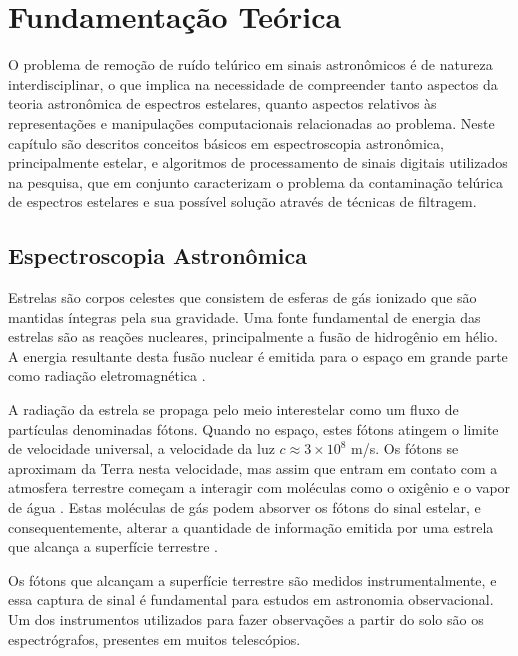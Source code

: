 \chapter{Fundamentação Teórica}
\label{cap:fundamentacao-teorica}

O problema de remoção de ruído telúrico em sinais astronômicos é de natureza interdisciplinar, o que implica na necessidade de compreender tanto aspectos da teoria astronômica de espectros estelares, quanto aspectos relativos às representações e manipulações computacionais relacionadas ao problema.
Neste capítulo são descritos conceitos básicos em espectroscopia astronômica, principalmente estelar, e algoritmos de processamento de sinais digitais utilizados na pesquisa, que em conjunto caracterizam o problema da contaminação telúrica de espectros estelares e sua possível solução através de técnicas de filtragem.

\section{Espectroscopia Astronômica} \label{astronomic-spectroscopy}

Estrelas são corpos celestes que consistem de esferas de gás ionizado que são mantidas íntegras pela sua gravidade. Uma fonte fundamental de energia das estrelas são as reações nucleares, principalmente a fusão de hidrogênio em hélio. A energia resultante desta fusão nuclear é emitida para o espaço em grande parte como radiação eletromagnética \citep{estrelas-ufrgs}.   

A radiação da estrela se propaga pelo meio interestelar como um fluxo de partículas denominadas fótons. Quando no espaço, estes fótons atingem o limite de velocidade universal, a velocidade da luz $\textit{c} \approx 3 \times 10^8$ m/s. Os fótons se aproximam da Terra nesta velocidade, mas assim que entram em contato com a atmosfera terrestre começam a interagir com moléculas como o oxigênio e o vapor de água \citep{wiki:photon}. Estas moléculas de gás podem absorver os fótons do sinal estelar, e consequentemente, alterar a quantidade de informação emitida por uma estrela que alcança a superfície terrestre \citep{wiki:telluric-contamination}.

Os fótons que alcançam a superfície terrestre são medidos instrumentalmente, e essa captura de sinal é fundamental para estudos em astronomia observacional. Um dos instrumentos utilizados para fazer observações a partir do solo são os espectrógrafos, presentes em muitos telescópios. 

